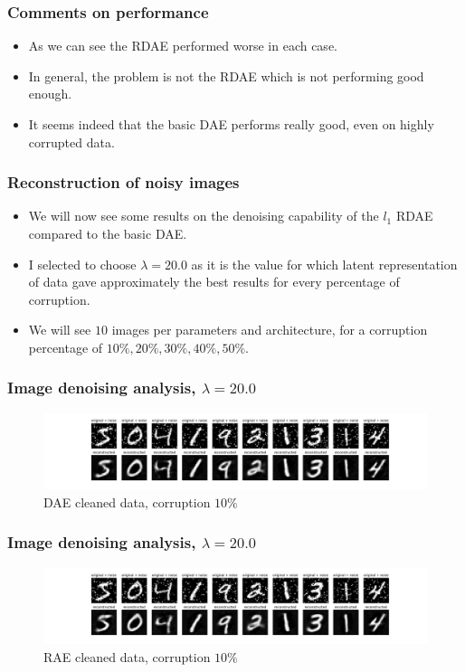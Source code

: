 \documentclass{beamer}
\theoremstyle{plain}
\theoremstyle{definition}
\theoremstyle{remark}
\begin{document}
\begin{frame}
	\frametitle{Comments on performance}
	\begin{itemize}
		\item As we can see the RDAE performed worse in each case.
		\item In general, the problem is not the RDAE which is not performing good enough.
		\item It seems indeed that the basic DAE performs really good, even on highly corrupted data.
	\end{itemize}
\end{frame}

\begin{frame}
	\frametitle{Reconstruction of noisy images}
	\begin{itemize}
		\item We will now see some results on the denoising capability of the $l_1$ RDAE compared to the basic DAE.
		\item I selected to choose $\lambda=20.0$ as it is the value for which latent representation of data gave approximately the best results for every percentage of corruption.
		\item We will see $10$ images per parameters and architecture, for a corruption percentage of $10\%, 20\%, 30\%, 40\%, 50\%$.
	\end{itemize}
\end{frame}

\begin{frame}
	\frametitle{Image denoising analysis, $\lambda=20.0$}
	\begin{figure}
		\centering
		\includegraphics[width=0.95\linewidth]{Images/lam20.0corr0.1/DAE_recon.png}
		\caption[]{DAE cleaned data, corruption $10\%$}
	\end{figure}
\end{frame}

\begin{frame}
	\frametitle{Image denoising analysis, $\lambda=20.0$}
	\begin{figure}
		\centering
		\includegraphics[width=0.95\linewidth]{Images/lam20.0corr0.1/RAE_recon.png}
		\caption[]{RAE cleaned data, corruption $10\%$}
	\end{figure}
\end{frame}
\end{document}
